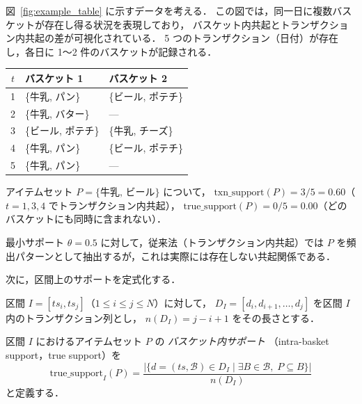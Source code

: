 \begin{example}[偽共起の発生]
\label{ex:spurious}
図~\ref{fig:example_table} に示すデータを考える．
この図では，同一日に複数バスケットが存在し得る状況を表現しており，
バスケット内共起とトランザクション内共起の差が可視化されている．
5 つのトランザクション（日付）が存在し，各日に 1〜2 件のバスケットが記録される．

\begin{center}
\begin{tabular}{cll}
\toprule
$t$ & バスケット 1 & バスケット 2 \\
\midrule
1 & \{牛乳, パン\}     & \{ビール, ポテチ\} \\
2 & \{牛乳, バター\}   & — \\
3 & \{ビール, ポテチ\} & \{牛乳, チーズ\} \\
4 & \{牛乳, パン\}     & \{ビール, ポテチ\} \\
5 & \{牛乳, パン\}     & — \\
\bottomrule
\end{tabular}
\end{center}

アイテムセット $P = \{\text{牛乳, ビール}\}$ について，
$\text{txn\_support}(P) = 3/5 = 0.60$（$t = 1, 3, 4$ でトランザクション内共起），
$\text{true\_support}(P) = 0/5 = 0.00$（どのバスケットにも同時に含まれない）．

最小サポート $\theta = 0.5$ に対して，従来法（トランザクション内共起）では
$P$ を頻出パターンとして抽出するが，これは実際には存在しない共起関係である．
\end{example}

次に，区間上のサポートを定式化する．

\begin{definition}[区間とデータサブセット]
区間 $I = [ts_i, ts_j]$（$1 \leq i \leq j \leq N$）に対して，
$D_I = [d_i, d_{i+1}, \ldots, d_j]$ を区間 $I$ 内のトランザクション列とし，
$n(D_I) = j - i + 1$ をその長さとする．
\end{definition}

\begin{definition}
\label{def:true_support}
区間 $I$ におけるアイテムセット $P$ の \emph{バスケット内サポート}
（intra-basket support，true support）を
\begin{equation}
\text{true\_support}_I(P) =
\frac{\bigl|\bigl\{d = (ts, \mathcal{B}) \in D_I
\;\big|\; \exists B \in \mathcal{B},\; P \subseteq B\bigr\}\bigr|}{n(D_I)}
\label{eq:true_support}
\end{equation}
と定義する．
\end{definition}

